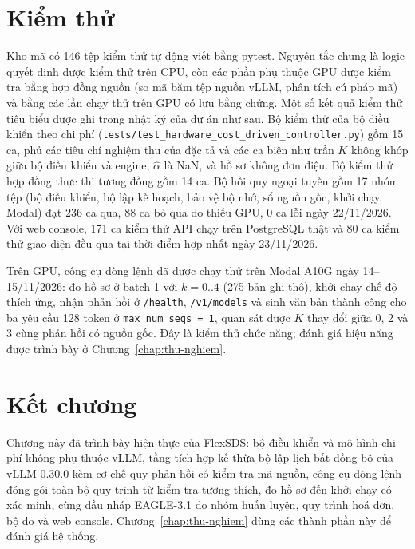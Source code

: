 \section{Kiểm thử}
\label{sec:kiem-thu}

Kho mã có 146 tệp kiểm thử tự động viết bằng pytest. Nguyên tắc chung là logic quyết định được kiểm thử trên CPU, còn các phần phụ thuộc GPU được kiểm tra bằng hợp đồng nguồn (so mã băm tệp nguồn vLLM, phân tích cú pháp mã) và bằng các lần chạy thử trên GPU có lưu bằng chứng. Một số kết quả kiểm thử tiêu biểu được ghi trong nhật ký của dự án như sau. Bộ kiểm thử của bộ điều khiển theo chi phí (\texttt{tests/test\_hardware\_cost\_driven\_controller.py}) gồm 15 ca, phủ các tiêu chí nghiệm thu của đặc tả và các ca biên như trần $K$ không khớp giữa bộ điều khiển và engine, $\hat{\alpha}$ là NaN, và hồ sơ không đơn điệu. Bộ kiểm thử hợp đồng thực thi tương đồng gồm 14 ca. Bộ hồi quy ngoại tuyến gồm 17 nhóm tệp (bộ điều khiển, bộ lập kế hoạch, bảo vệ bộ nhớ, sổ nguồn gốc, khởi chạy, Modal) đạt 236 ca qua, 88 ca bỏ qua do thiếu GPU, 0 ca lỗi ngày 22/11/2026. Với web console, 171 ca kiểm thử API chạy trên PostgreSQL thật và 80 ca kiểm thử giao diện đều qua tại thời điểm hợp nhất ngày 23/11/2026. 

Trên GPU, công cụ dòng lệnh đã được chạy thử trên Modal A10G ngày 14--15/11/2026: đo hồ sơ ở batch 1 với $k = 0..4$ (275 bản ghi thô), khởi chạy chế độ thích ứng, nhận phản hồi ở \texttt{/health}, \texttt{/v1/models} và sinh văn bản thành công cho ba yêu cầu 128 token ở \texttt{max\_num\_seqs = 1}, quan sát được $K$ thay đổi giữa 0, 2 và 3 cùng phản hồi có nguồn gốc. Đây là kiểm thử chức năng; đánh giá hiệu năng được trình bày ở Chương~\ref{chap:thu-nghiem}.

\section{Kết chương}

Chương này đã trình bày hiện thực của FlexSDS: bộ điều khiển và mô hình chi phí không phụ thuộc vLLM, tầng tích hợp kế thừa bộ lập lịch bất đồng bộ của vLLM 0.30.0 kèm cơ chế quy phản hồi có kiểm tra mã nguồn, công cụ dòng lệnh đóng gói toàn bộ quy trình từ kiểm tra tương thích, đo hồ sơ đến khởi chạy có xác minh, cùng đầu nháp EAGLE-3.1 do nhóm huấn luyện, quy trình hoá đơn, bộ đo và web console. Chương~\ref{chap:thu-nghiem} dùng các thành phần này để đánh giá hệ thống.
